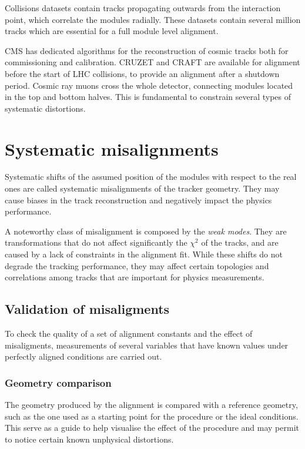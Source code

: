Collisions datasets contain tracks propagating outwards from the interaction point, which correlate the modules radially.
These datasets contain several million tracks which are essential for a full module level alignment.

CMS has dedicated algorithms for the reconstruction of cosmic tracks both for commissioning and calibration.
CRUZET and CRAFT are available for alignment before the start of LHC collisions, to provide an alignment after a shutdown period.
Cosmic ray muons cross the whole detector, connecting modules located in the top and bottom halves.
This is fundamental to constrain several types of systematic distortions.

\section{Systematic misalignments}
Systematic shifts of the assumed position of the modules with respect to the real ones
are called systematic misalignments of the tracker geometry. They
may cause biases in the track reconstruction and negatively impact the physics performance.

A noteworthy class of misalignment is composed by the \textit{weak modes}.
They are transformations that do not affect significantly the $\chi^2$ of the tracks,
and are caused by a lack of constraints in the alignment fit.
While these shifts do not degrade the tracking performance,
they may affect certain topologies and correlations among tracks that are important for physics measurements.

\subsection{Validation of misaligments}
To check the quality of a set of alignment constants and the effect of misaligments,
measurements of several variables that have known values under perfectly aligned conditions are carried out.

\subsubsection{Geometry comparison} %
The geometry produced by the alignment is compared with a reference geometry,
such as the one used as a starting point for the procedure or the ideal conditions.
This serve as a guide to help visualise the effect of the procedure
and may permit to notice certain known unphysical distortions.


